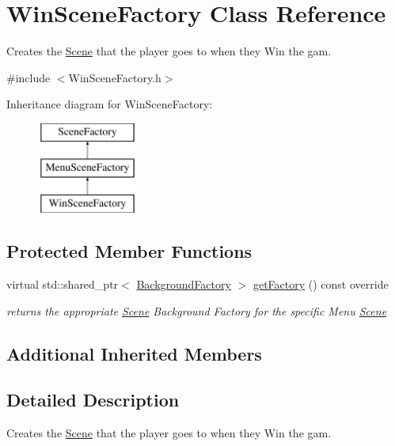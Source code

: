 \hypertarget{class_win_scene_factory}{}\section{Win\+Scene\+Factory Class Reference}
\label{class_win_scene_factory}


Creates the \hyperlink{class_scene}{Scene} that the player goes to when they Win the gam.  




{\ttfamily \#include $<$Win\+Scene\+Factory.\+h$>$}

Inheritance diagram for Win\+Scene\+Factory\+:\begin{figure}[H]
\begin{center}
\leavevmode
\includegraphics[height=3.000000cm]{d3/db7/class_win_scene_factory}
\end{center}
\end{figure}
\subsection*{Protected Member Functions}
\begin{DoxyCompactItemize}
\item 
virtual std\+::shared\+\_\+ptr$<$ \hyperlink{class_background_factory}{Background\+Factory} $>$ \hyperlink{class_win_scene_factory_af2e1c7ae34601b5f4017937d7bd381bb}{get\+Factory} () const override
\begin{DoxyCompactList}\small\item\em returns the appropriate \hyperlink{class_scene}{Scene} Background Factory for the specific Menu \hyperlink{class_scene}{Scene} \end{DoxyCompactList}\end{DoxyCompactItemize}
\subsection*{Additional Inherited Members}


\subsection{Detailed Description}
Creates the \hyperlink{class_scene}{Scene} that the player goes to when they Win the gam. 

